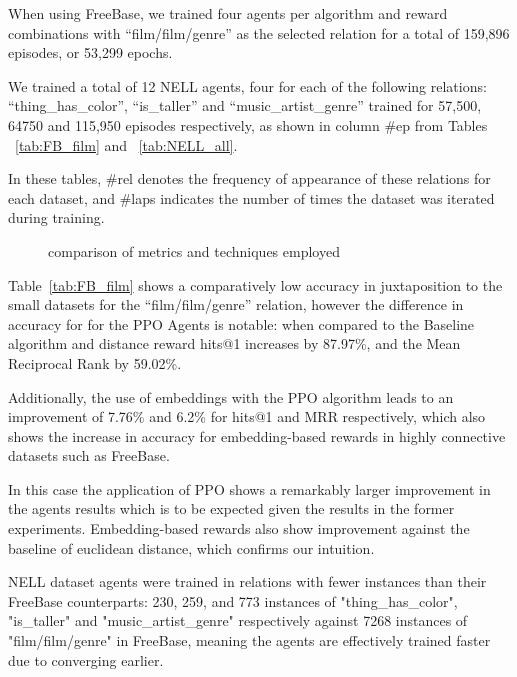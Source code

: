 When using FreeBase, we trained four agents per algorithm and reward combinations with ``film/film/genre'' as the selected relation for a total of 159,896 episodes, or 53,299 epochs.

We trained a total of 12 NELL agents, four for each of the following relations: ``thing\_has\_color'', ``is\_taller'' and ``music\_artist\_genre'' trained for 57,500, 64750 and 115,950 episodes respectively, as shown in column \#ep from Tables ~\ref{tab:FB_film} and ~\ref{tab:NELL_all}.

In these tables, \#rel denotes the frequency of appearance of these relations for each dataset, and \#laps indicates the number of times the dataset was iterated during training.




\begin{figure}[!h]
    \centering
    
    \caption{comparison of metrics and techniques employed}
    \label{fig:metricsbarchart}
\end{figure}


Table~\ref{tab:FB_film} shows a comparatively low accuracy in juxtaposition to the small datasets for the ``film/film/genre'' relation, however the difference in accuracy for for the PPO Agents is notable: when compared to the Baseline algorithm and distance reward hits@1 increases by 87.97\%, and the Mean Reciprocal Rank by 59.02\%.

Additionally, the use of embeddings with the PPO algorithm leads to an improvement of 7.76\% and 6.2\% for hits@1 and MRR respectively, which also shows the increase in accuracy for embedding-based rewards in highly connective datasets such as FreeBase.

In this case the application of PPO shows a remarkably larger improvement in the agents results which is to be expected given the results in the former experiments. Embedding-based rewards also show improvement against the baseline of euclidean distance, which confirms our intuition. %



NELL dataset agents were trained in relations with fewer instances than their FreeBase counterparts: 230, 259, and 773 instances of "thing\_has\_color", "is\_taller" and "music\_artist\_genre" respectively against 7268 instances of "film/film/genre" in FreeBase, meaning the agents are effectively trained faster due to converging earlier.

